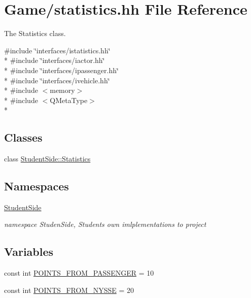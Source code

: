\hypertarget{statistics_8hh}{\section{Game/statistics.hh File Reference}
\label{statistics_8hh}
}


The Statistics class.  


{\ttfamily \#include \char`\"{}interfaces/istatistics.\-hh\char`\"{}}\\*
{\ttfamily \#include \char`\"{}interfaces/iactor.\-hh\char`\"{}}\\*
{\ttfamily \#include \char`\"{}interfaces/ipassenger.\-hh\char`\"{}}\\*
{\ttfamily \#include \char`\"{}interfaces/ivehicle.\-hh\char`\"{}}\\*
{\ttfamily \#include $<$memory$>$}\\*
{\ttfamily \#include $<$Q\-Meta\-Type$>$}\\*
\subsection*{Classes}
\begin{DoxyCompactItemize}
\item 
class \hyperlink{class_student_side_1_1_statistics}{Student\-Side\-::\-Statistics}
\end{DoxyCompactItemize}
\subsection*{Namespaces}
\begin{DoxyCompactItemize}
\item 
\hyperlink{namespace_student_side}{Student\-Side}
\begin{DoxyCompactList}\small\item\em namespace Studen\-Side, Students own imlplementations to project \end{DoxyCompactList}\end{DoxyCompactItemize}
\subsection*{Variables}
\begin{DoxyCompactItemize}
\item 
const int \hyperlink{statistics_8hh_ac9a5f98765234c28f52a4da93922c103}{P\-O\-I\-N\-T\-S\-\_\-\-F\-R\-O\-M\-\_\-\-P\-A\-S\-S\-E\-N\-G\-E\-R} = 10
\item 
const int \hyperlink{statistics_8hh_a8428d5d2e081c369dfe486b33b2f2473}{P\-O\-I\-N\-T\-S\-\_\-\-F\-R\-O\-M\-\_\-\-N\-Y\-S\-S\-E} = 20
\end{DoxyCompactItemize}


